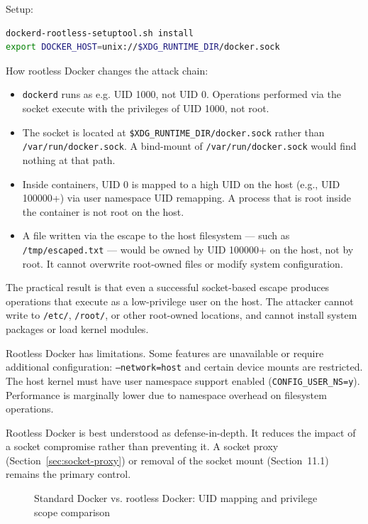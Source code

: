 Setup:

\begin{lstlisting}[language=bash]
dockerd-rootless-setuptool.sh install
export DOCKER_HOST=unix://$XDG_RUNTIME_DIR/docker.sock
\end{lstlisting}

How rootless Docker changes the attack chain:

\begin{itemize}
    \item \texttt{dockerd} runs as e.g. UID 1000, not UID 0. Operations performed via the socket execute with the privileges of UID 1000, not root.
    \item The socket is located at \texttt{\$XDG\_RUNTIME\_DIR/docker.sock} rather than
\texttt{/var/run/docker.sock}. A bind-mount of \texttt{/var/run/docker.sock} would find nothing at that path.
    \item Inside containers, UID 0 is mapped to a high UID on the host (e.g., UID 100000+) via user namespace UID remapping. A process that is root inside the container is not root on the host.
    \item A file written via the escape to the host filesystem --- such as \texttt{/tmp/escaped.txt} --- would be owned by UID 100000+ on the host, not by root. It cannot overwrite root-owned files or modify system configuration.
\end{itemize}

The practical result is that even a successful socket-based escape produces operations that execute as a low-privilege user on the host. The attacker cannot write to \texttt{/etc/}, \texttt{/root/}, or other root-owned locations, and cannot install system packages or load kernel modules.

Rootless Docker has limitations. Some features are unavailable or require additional configuration: \texttt{--network=host} and certain device mounts are restricted. The host kernel must have user namespace support enabled (\texttt{CONFIG\_USER\_NS=y}). Performance is marginally lower due to namespace overhead on filesystem operations.

Rootless Docker is best understood as defense-in-depth. It reduces the impact of a socket compromise rather than preventing it. A socket proxy (Section~\ref{sec:socket-proxy}) or removal of the socket mount (Section~11.1) remains the primary control.

\begin{figure}[h]
\centering
\vspace{3cm}
\caption{Standard Docker vs. rootless Docker: UID mapping and privilege scope comparison}
\end{figure}

